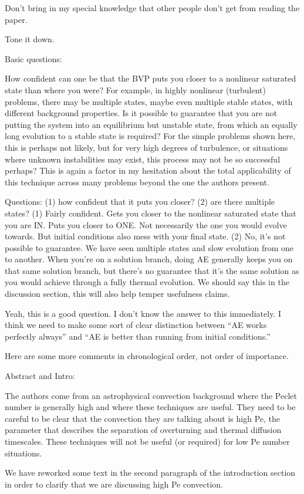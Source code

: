 \documentclass[aps, 11pt, singlecolumn]{revtex4-1} %
\begin{document}
\begin{singlespace}
Don't bring in my special knowledge that other people don't get from
reading the paper.

Tone it down.

\begin{myquotation}
Basic questions:

How confident can one be that the BVP puts you closer to a nonlinear
saturated state than where you were? For example, in highly nonlinear
(turbulent) problems, there may be multiple states, maybe even
multiple stable states, with different background properties. Is it
possible to guarantee that you are not putting the system into an
equilibrium but unstable state, from which an equally long evolution
to a stable state is required? For the simple problems shown here,
this is perhaps not likely, but for very high degrees of turbulence,
or situations where unknown instabilities may exist, this process may
not be so successful perhaps? This is again a factor in my hesitation
about the total applicability of this technique across many problems
beyond the one the authors present.
\end{myquotation}
Questions: (1) how confident that it puts you closer? (2) are there multiple states?
(1) Fairly confident. Gets you closer to the nonlinear saturated state that you are
IN. Puts you closer to ONE. Not necessarily the one you would evolve towards. But
initial conditions also mess with your final state.
(2) No, it's not possible to guarantee. We have seen multiple states and
slow evolution from one to another. When you're on a solution branch, doing AE
generally keeps you on that same solution branch, but there's no guarantee that it's
the same solution as you would achieve through a fully thermal evolution. We should
say this in the discussion section, this will also help temper usefulness claims.

Yeah, this is a good question. I don't know the answer to this immediately.
I think we need to make some sort of clear distinction between ``AE works
perfectly always'' and ``AE is better than running from initial conditions.''


\begin{myquotation}
Here are some more comments in chronological order, not order of
importance.

Abstract and Intro:

The authors come from an astrophysical convection background where the
Peclet number is generally high and where these techniques are useful.
They need to be careful to be clear that the convection they are
talking about is high Pe, the parameter that describes the separation
of overturning and thermal diffusion timescales. These techniques will
not be useful (or required) for low Pe number situations.
\end{myquotation}
We have reworked some text in the second paragraph of the introduction section
in order to clarify that we are discussing high Pe convection.


\end{singlespace}
\end{document}

